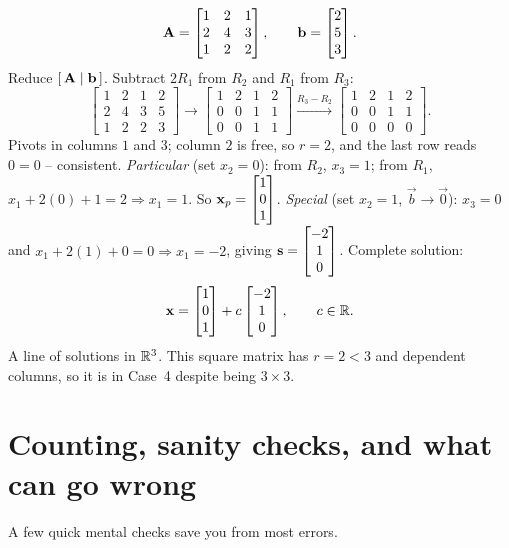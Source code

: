 \begin{example}
\label{ch13:square}
\[
  \mathbf{A}=\begin{bmatrix}1&2&1\\2&4&3\\1&2&2\end{bmatrix},\qquad
  \mathbf{b}=\begin{bmatrix}2\\5\\3\end{bmatrix}.
\]
Reduce $[\,\mathbf{A}\mid\mathbf{b}\,]$. Subtract $2R_1$ from $R_2$ and $R_1$ from $R_3$:
\[
  \left[\begin{array}{ccc|c}1&2&1&2\\2&4&3&5\\1&2&2&3\end{array}\right]
  \longrightarrow
  \left[\begin{array}{ccc|c}1&2&1&2\\0&0&1&1\\0&0&1&1\end{array}\right]
  \xrightarrow{R_3-R_2}
  \left[\begin{array}{ccc|c}1&2&1&2\\0&0&1&1\\0&0&0&0\end{array}\right].
\]
Pivots in columns $1$ and $3$; column $2$ is free, so $r=2$, and the last row reads $0=0$
-- consistent. \emph{Particular} (set $x_2=0$): from $R_2$, $x_3=1$; from $R_1$,
$x_1+2(0)+1=2\Rightarrow x_1=1$. So $\mathbf{x}_p=\begin{bmatrix}1\\0\\1\end{bmatrix}$. \emph{Special} (set
$x_2=1$, $\vec b\to\vec 0$): $x_3=0$ and $x_1+2(1)+0=0\Rightarrow x_1=-2$, giving
$\mathbf{s}=\begin{bmatrix}-2\\1\\0\end{bmatrix}$. Complete solution:
\[
  \mathbf{x}=\begin{bmatrix}1\\0\\1\end{bmatrix}+c\begin{bmatrix}-2\\1\\0\end{bmatrix},\qquad c\in\mathbb{R}.
\]
A line of solutions in $\mathbb{R}^3$. This square matrix has $r=2<3$ and dependent columns, so
it is in Case~4 despite being $3\times 3$.
\end{example}

\section{Counting, sanity checks, and what can go wrong}

A few quick mental checks save you from most errors.

